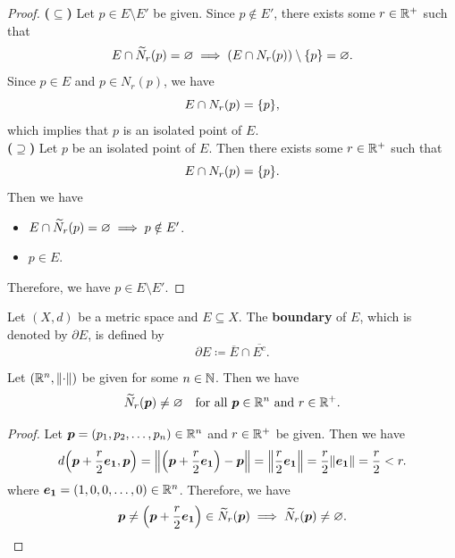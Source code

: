 \begin{proof}
    \textbf{($\subseteq$)} Let $p \in E \setminus E'$ be given.
    Since $p \notin E'$, there exists some $r \in \R^{+}$ such that
    \[
    E \cap \widetilde{N}_{r}(p) = \vnot \implies \paren*{E \cap N_{r}(p)} \setminus \set*{p} = \vnot.
    \]
    Since $p \in E$ and $p \in N_{r}(p)$, we have
    \[
    E \cap N_{r}(p) = \set*{p},
    \]
    which implies that $p$ is an isolated point of $E$.
    \\[6mm]
    \textbf{($\supseteq$)} Let $p$ be an isolated point of $E$. Then there exists some $r \in \R^{+}$ such that
    \[
    E \cap N_{r}(p) = \set*{p}.
    \]
    Then we have
    \begin{itemize}
        \item $E \cap \widetilde{N}_{r}(p) = \vnot \implies p \notin E'$.
        \item $p \in E$.
    \end{itemize}
    Therefore, we have $p \in E \setminus E'$.
\end{proof}

\bigskip

\begin{definition} \label{def:Boundary}
    Let $(X, d)$ be a metric space and $E \subseteq X$. The \textbf{boundary} of $E$,
    which is denoted by $\partial E$, is defined by
    \[
    \partial E \coloneqq \overline{E} \cap \overline{E^{c}}.
    \]
\end{definition}

\bigskip

\begin{lemma} \label{lem:DeletedNeighborhoodInRnIsNonEmpty}
    Let $(\R^{n}, \norm*{\cdot})$ be given for some $n \in \N$. Then we have
    \[
    \widetilde{N}_r(\bm{p}) \neq \vnot \quad \text{for all } \bm{p} \in \R^{n} \text{ and } r \in \R^{+}.
    \]
\end{lemma}

\begin{proof}
    Let $\bm{p} = (p_{1}, p_{2}, \dots, p_{n}) \in \R^{n}$ and $r \in \R^{+}$ be given. Then we have
    \[
    d\paren*{\bm{p} + \frac{r}{2} \bm{e_{1}}, \bm{p}} = \norm*{\paren*{\bm{p} + \frac{r}{2} \bm{e_{1}}}
    - \bm{p}} = \norm*{\frac{r}{2} \bm{e_{1}}} = \frac{r}{2} \norm*{\bm{e_{1}}} = \frac{r}{2} < r.
    \]
    where $\bm{e_{1}} = (1, 0, 0, \dots, 0) \in \R^{n}$. Therefore, we have
    \[
    \bm{p} \neq \paren*{\bm{p} + \frac{r}{2} \bm{e_{1}}} \in \widetilde{N}_r(\bm{p}) \implies \widetilde{N}_r(\bm{p}) \neq \vnot.
    \]
\end{proof}

